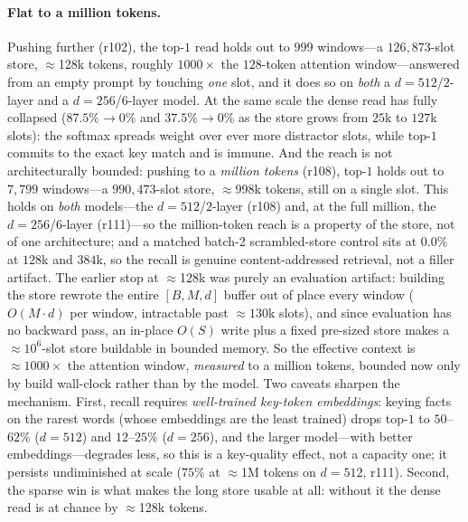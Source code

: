 \paragraph{Flat to a million tokens.} Pushing further (r102), the
top-$1$ read holds  out to $999$ windows---a $126{,}873$-slot store, $\approx$128k
tokens, roughly $1000\times$ the $128$-token attention window---answered from an empty prompt by
touching \emph{one} slot, and it does so on \emph{both} a $d{=}512$/$2$-layer and a
$d{=}256$/$6$-layer model. At the same scale the dense read has fully collapsed
($87.5\%\!\to\!0\%$ and $37.5\%\!\to\!0\%$ as the store grows from $25$k to $127$k slots): the
softmax spreads weight over ever more distractor slots, while top-$1$ commits to the exact key
match and is immune. And the reach is not architecturally bounded: pushing to a
\emph{million tokens} (r108), top-$1$ holds  out to $7{,}799$ windows---a
$990{,}473$-slot store, $\approx$998k tokens, still on a single slot. This holds on
\emph{both} models---the $d{=}512$/$2$-layer (r108) and, at the full million, the
$d{=}256$/$6$-layer (r111)---so the million-token reach is a property of the store, not of
one architecture; and a matched batch-2 scrambled-store control sits at $0.0\%$ at $128$k
and $384$k, so the recall is genuine content-addressed retrieval, not a filler artifact.
The earlier stop at
$\approx$128k was purely an evaluation artifact: building the store rewrote the entire
$[B,M,d]$ buffer out of place every window ($O(M{\cdot}d)$ per window, intractable past
$\approx$$130$k slots), and since evaluation has no backward pass, an in-place $O(S)$ write
plus a fixed pre-sized store makes a $\approx$$10^{6}$-slot store buildable in bounded memory.
So the effective context is $\approx\!1000\times$ the attention window, \emph{measured} to a
million tokens, bounded now only by build wall-clock rather than by the model. Two caveats
sharpen the mechanism. First, recall requires \emph{well-trained key-token
embeddings}: keying facts on the rarest words (whose embeddings are the least trained) drops
top-$1$ to $50$--$62\%$ ($d{=}512$) and $12$--$25\%$ ($d{=}256$), and the larger model---with
better embeddings---degrades less, so this is a key-quality effect, not a capacity one; it
persists undiminished at scale ($75\%$ at $\approx$1M tokens on $d{=}512$, r111). Second,
the sparse win is what makes the long store usable at all: without it the dense read is at chance
by $\approx$128k tokens.

